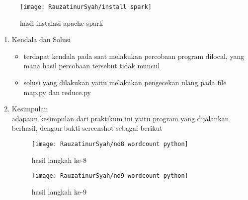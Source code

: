 \begin{figure}[!ht]
\texttt{[image: RauzatinurSyah/install spark]}
\caption{hasil instalasi apache spark }
\label{gam:hasil instalasi spark}
\end{figure}


\begin{enumerate}
\item Kendala dan Solusi\\
\begin{itemize}
\item terdapat kendala pada saat melakukan percobaan program dilocal, yang mana hasil percobaan tersebut tidak muncul
\item solusi yang dilakukan yaitu melakukan pengecekan ulang pada file map.py dan reduce.py

\end{itemize}

\item Kesimpulan\\
adapaun kesimpulan dari praktikum ini yaitu program yang dijalankan berhasil, dengan bukti screenshot sebagai berikut

\begin{figure}[!ht]
\texttt{[image: RauzatinurSyah/no8 wordcount python]}
\caption{hasil langkah ke-8 }
\label{gam:hasil program WordCountPython}
\end{figure}

\begin{figure}[!ht]
\texttt{[image: RauzatinurSyah/no9 wordcount python]}
\caption{hasil langkah ke-9 }
\label{gam:hasil program WordCountPython}
\end{figure}

\end{enumerate}


